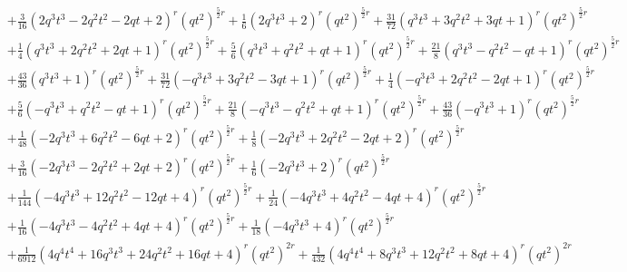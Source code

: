 \documentclass[11pt,english]{amsart}
\numberwithin{equation}{section}
\numberwithin{figure}{section}
\theoremstyle{plain}
\theoremstyle{plain}
\theoremstyle{definition}
\theoremstyle{remark}
\begin{document}
{\begin{align*}
& + \frac{3}{16}  {\left(2  q^{3} t^{3} - 2  q^{2} t^{2} - 2  q t + 2\right)}^{r} \left(q t^{2}\right)^{\frac{5}{2}  r} + \frac{1}{6}  {\left(2  q^{3} t^{3} + 2\right)}^{r} \left(q t^{2}\right)^{\frac{5}{2}  r} + \frac{31}{72}  {\left(q^{3} t^{3} + 3  q^{2} t^{2} + 3  q t + 1\right)}^{r} \left(q t^{2}\right)^{\frac{5}{2}  r} \\
& + \frac{1}{4}  {\left(q^{3} t^{3} + 2  q^{2} t^{2} + 2  q t + 1\right)}^{r} \left(q t^{2}\right)^{\frac{5}{2}  r} + \frac{5}{6}  {\left(q^{3} t^{3} + q^{2} t^{2} + q t + 1\right)}^{r} \left(q t^{2}\right)^{\frac{5}{2}  r} + \frac{21}{8}  {\left(q^{3} t^{3} - q^{2} t^{2} - q t + 1\right)}^{r} \left(q t^{2}\right)^{\frac{5}{2}  r} \\
& + \frac{43}{36}  {\left(q^{3} t^{3} + 1\right)}^{r} \left(q t^{2}\right)^{\frac{5}{2}  r} + \frac{31}{72}  {\left(-q^{3} t^{3} + 3  q^{2} t^{2} - 3  q t + 1\right)}^{r} \left(q t^{2}\right)^{\frac{5}{2}  r} + \frac{1}{4}  {\left(-q^{3} t^{3} + 2  q^{2} t^{2} - 2  q t + 1\right)}^{r} \left(q t^{2}\right)^{\frac{5}{2}  r} \\
& + \frac{5}{6}  {\left(-q^{3} t^{3} + q^{2} t^{2} - q t + 1\right)}^{r} \left(q t^{2}\right)^{\frac{5}{2}  r} + \frac{21}{8}  {\left(-q^{3} t^{3} - q^{2} t^{2} + q t + 1\right)}^{r} \left(q t^{2}\right)^{\frac{5}{2}  r} + \frac{43}{36}  {\left(-q^{3} t^{3} + 1\right)}^{r} \left(q t^{2}\right)^{\frac{5}{2}  r} \\
& + \frac{1}{48}  {\left(-2  q^{3} t^{3} + 6  q^{2} t^{2} - 6  q t + 2\right)}^{r} \left(q t^{2}\right)^{\frac{5}{2}  r} + \frac{1}{8}  {\left(-2  q^{3} t^{3} + 2  q^{2} t^{2} - 2  q t + 2\right)}^{r} \left(q t^{2}\right)^{\frac{5}{2}  r} \\
& + \frac{3}{16}  {\left(-2  q^{3} t^{3} - 2  q^{2} t^{2} + 2  q t + 2\right)}^{r} \left(q t^{2}\right)^{\frac{5}{2}  r} + \frac{1}{6}  {\left(-2  q^{3} t^{3} + 2\right)}^{r} \left(q t^{2}\right)^{\frac{5}{2}  r} \\
& + \frac{1}{144}  {\left(-4  q^{3} t^{3} + 12  q^{2} t^{2} - 12  q t + 4\right)}^{r} \left(q t^{2}\right)^{\frac{5}{2}  r} + \frac{1}{24}  {\left(-4  q^{3} t^{3} + 4  q^{2} t^{2} - 4  q t + 4\right)}^{r} \left(q t^{2}\right)^{\frac{5}{2}  r} \\
& + \frac{1}{16}  {\left(-4  q^{3} t^{3} - 4  q^{2} t^{2} + 4  q t + 4\right)}^{r} \left(q t^{2}\right)^{\frac{5}{2}  r} + \frac{1}{18}  {\left(-4  q^{3} t^{3} + 4\right)}^{r} \left(q t^{2}\right)^{\frac{5}{2}  r} \\
& + \frac{1}{6912}  {\left(4  q^{4} t^{4} + 16  q^{3} t^{3} + 24  q^{2} t^{2} + 16  q t + 4\right)}^{r} \left(q t^{2}\right)^{2  r} + \frac{1}{432}  {\left(4  q^{4} t^{4} + 8  q^{3} t^{3} + 12  q^{2} t^{2} + 8  q t + 4\right)}^{r} \left(q t^{2}\right)^{2  r} \\

\end{align*}}
\end{document}
